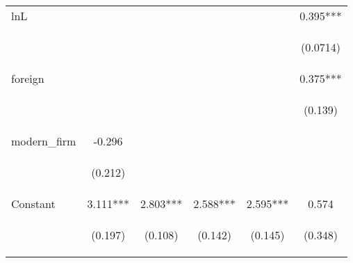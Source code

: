 \begin{center}
\begin{tabular}{lccccc}
lnL &  &  &  &  & 0.395*** \\
\vspace{4pt} & \begin{footnotesize}\end{footnotesize} & \begin{footnotesize}\end{footnotesize} & \begin{footnotesize}\end{footnotesize} & \begin{footnotesize}\end{footnotesize} & \begin{footnotesize}(0.0714)\end{footnotesize} \\
foreign &  &  &  &  & 0.375*** \\
\vspace{4pt} & \begin{footnotesize}\end{footnotesize} & \begin{footnotesize}\end{footnotesize} & \begin{footnotesize}\end{footnotesize} & \begin{footnotesize}\end{footnotesize} & \begin{footnotesize}(0.139)\end{footnotesize} \\
modern\_firm & -0.296 &  &  &  &  \\
\vspace{4pt} & \begin{footnotesize}(0.212)\end{footnotesize} & \begin{footnotesize}\end{footnotesize} & \begin{footnotesize}\end{footnotesize} & \begin{footnotesize}\end{footnotesize} & \begin{footnotesize}\end{footnotesize} \\
Constant & 3.111*** & 2.803*** & 2.588*** & 2.595*** & 0.574 \\
 & \begin{footnotesize}(0.197)\end{footnotesize} & \begin{footnotesize}(0.108)\end{footnotesize} & \begin{footnotesize}(0.142)\end{footnotesize} & \begin{footnotesize}(0.145)\end{footnotesize} & \begin{footnotesize}(0.348)\end{footnotesize} \\

\end{tabular}
\end{center}
